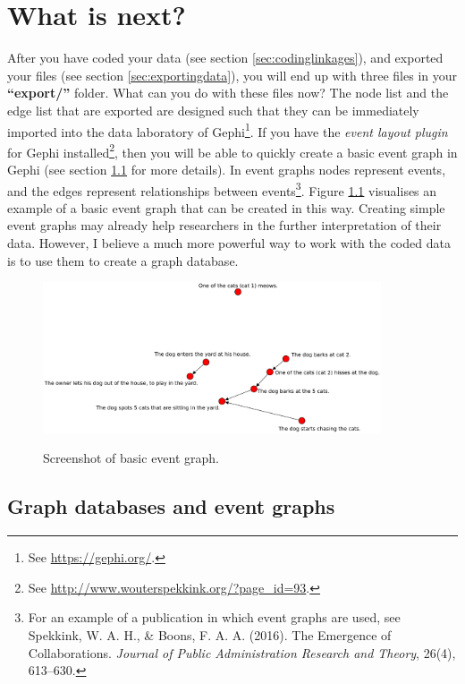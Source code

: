 \documentclass{memoir}
\begin{document}
\chapter{What is next?}
\label{chap:whatisnext}

After you have coded your data (see section \ref{sec:codinglinkages}), and exported your files (see section \ref{sec:exportingdata}), you will end up with three files in your \textbf{``export/''} folder. What can you do with these files now? The node list and the edge list that are exported are designed such that they can be immediately imported into the data laboratory of Gephi\footnote{See \url{https://gephi.org/}.}. If you have the \emph{event layout plugin} for Gephi installed\footnote{See \url{http://www.wouterspekkink.org/?page_id=93}.}, then you will be able to quickly create a basic event graph in Gephi (see section \ref{sec:graphdatabasesandeventgraphs} for more details). In event graphs nodes represent events, and the edges represent relationships between events\footnote{For an example of a publication in which event graphs are used, see Spekkink, W. A. H., \& Boons, F. A. A. (2016). The Emergence of Collaborations. \emph{Journal of Public Administration Research and Theory}, 26(4), 613–630.}. Figure \ref{fig:eventgraphone} visualises an example of a basic event graph that can be created in this way. Creating simple event graphs may already help researchers in the further interpretation of their data. However, I believe a much more powerful way to work with the coded data is to use them to create a graph database. 

\begin{figure}[h!]
  \centering
  \caption{Screenshot of basic event graph.}
  \includegraphics[width=100mm]{Diagram_3.pdf}
  \label{fig:eventgraphone}
\end{figure}

\section{Graph databases and event graphs}
\label{sec:graphdatabasesandeventgraphs}
\end{document}
